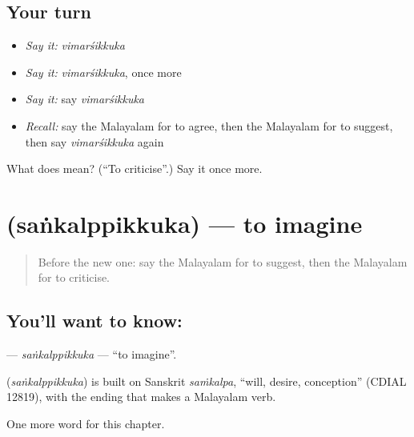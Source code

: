 \subsection*{Your turn}
\begin{itemize}
\raggedright
  \item \emph{Say it:} \emph{vimarśikkuka}
  \item \emph{Say it:} \emph{vimarśikkuka}, once more
  \item \emph{Say it:} say \emph{vimarśikkuka}
  \item \emph{Recall:} say the Malayalam for to agree, then the Malayalam for to suggest, then say \emph{vimarśikkuka} again
\end{itemize}

\begin{tcolorbox}[breakable,colback=teal!4,colframe=teal!35!black,title={Before you move on}]
What does  mean? (\textquotedblleft{}To criticise\textquotedblright{}.) Say it once more.
\end{tcolorbox}
\section[\texorpdfstring{\ml{സങ്കൽപ്പിക്കുക} (saṅkalppikkuka)}{സങ്കൽപ്പിക്കുക (saṅkalppikkuka)}]{ (saṅkalppikkuka) — to imagine}

\label{lesson:ML-C230-sankalppikkuka}



\begin{quote}
Before the new one: say the Malayalam for to suggest, then the Malayalam for to criticise.
\end{quote}

\subsection*{You'll want to know: }
\textbf{} — \emph{saṅkalppikkuka} — \textquotedblleft{}to imagine\textquotedblright{}.

\begin{cousinweb}
\textbf{} (\emph{saṅkalppikkuka}) is built on Sanskrit \emph{saṁkalpa}, \textquotedblleft{}will, desire, conception\textquotedblright{} (CDIAL 12819), with the ending that makes a Malayalam verb.
\end{cousinweb}

\begin{grammarlens}[title={What you've built}]
One more word for this chapter.
\end{grammarlens}

